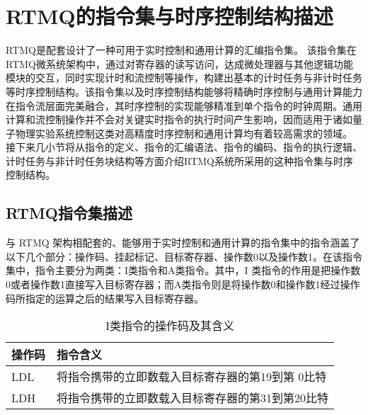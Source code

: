 


\section[RTMQ的指令集与时序控制结构描述]{RTMQ的指令集与时序控制结构描述\label{section:rtmq_instructions}}
RTMQ是配套设计了一种可用于实时控制和通用计算的汇编指令集\cite[]{junhua03}。
该指令集在RTMQ微系统架构中，通过对寄存器的读写访问，达成微处理器与其他逻辑功能模块的交互，同时实现计时和流控制等操作，构建出基本的计时任务与非计时任务等时序控制结构。该指令集以及时序控制结构能够将精确时序控制与通用计算能力在指令流层面完美融合，其时序控制的实现能够精准到单个指令的时钟周期。通用计算和流控制操作并不会对关键实时指令的执行时间产生影响，因而适用于诸如量子物理实验系统控制这类对高精度时序控制和通用计算均有着较高需求的领域。
接下来几小节将从指令的定义、指令的汇编语法、指令的编码、指令的执行逻辑、计时任务与非计时任务块结构等方面介绍RTMQ系统所采用的这种指令集与时序控制结构。

\subsection[RTMQ指令集描述]{RTMQ指令集描述\label{section:rtmq_instruction_set}}


与 RTMQ 架构相配套的、能够用于实时控制和通用计算的指令集中的指令涵盖了以下几个部分：操作码、挂起标记、目标寄存器、操作数0以及操作数1。在该指令集中，指令主要分为两类：I类指令和A类指令。其中，I 类指令的作用是把操作数0或者操作数1直接写入目标寄存器；而A类指令则是将操作数0和操作数1经过操作码所指定的运算之后的结果写入目标寄存器。


\begin{table}
    \centering
    \caption[I类指令的操作码及其含义]{I类指令的操作码及其含义\label{tb:i_instructions}}
    \begin{tabular}{C{2cm}|C{12cm}}
        \toprule
        操作码 & 指令含义 \\
        \midrule
        LDL & 将指令携带的立即数载入目标寄存器的第19到第 0比特\\
        LDH & 将指令携带的立即数载入目标寄存器的第31到第20比特\\
        \bottomrule
    \end{tabular}
\end{table}

